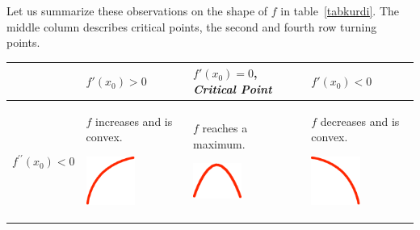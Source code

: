 Let us summarize these observations on the shape of $f$ in
table~\ref{tabkurdi}. The middle column describes critical points, the
second and fourth row turning points.
\begin{table}
{
\begin{center}
\begin{tabular}{p{17mm}|p{25mm}|p{25mm}|p{25mm}}
&$f'(x_0)>0$&
$f'(x_0)=0$, {\em Critical Point}&
$f'(x_0)<0$\\
\hline
$f^{\prime\prime}(x_0)<0$&
\begin{raggedright}
$f$ increases and is convex.
\centerline{\includegraphics[width=16mm]{pic/CTL.png}}
\end{raggedright}&%
\begin{raggedright}
$f$ reaches a maximum.
\centerline{\includegraphics[width=16mm]{pic/CMA.png}}
\end{raggedright}&%
\begin{raggedright}
$f$ decreases and is convex.
\centerline{\includegraphics[width=16mm]{pic/CTR.png}}
\end{raggedright}
\\


\end{tabular}
\end{center}}
\end{table}
